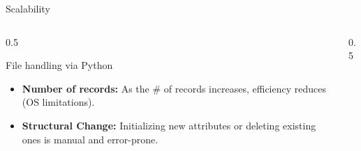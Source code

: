 \documentclass[aspectratio=169, xcolor=dvipsnames]{beamer}
\begin{document}
\begin{frame}{Scalability}
    \begin{columns}
        \begin{column}{0.5\textwidth}
            \begin{alertblock}{File handling via Python}
                \begin{itemize}[<+->]
                    \item \textbf{Number of records:} As the \# of records increases, efficiency reduces (OS limitations).
                    \item \textbf{Structural Change:} Initializing new attributes or deleting existing ones is manual and error-prone.
                \end{itemize}
            \end{alertblock}
        \end{column}
        \begin{column}{0.5\textwidth}
        \end{column}
    \end{columns}
\end{frame}
    
\end{document}
